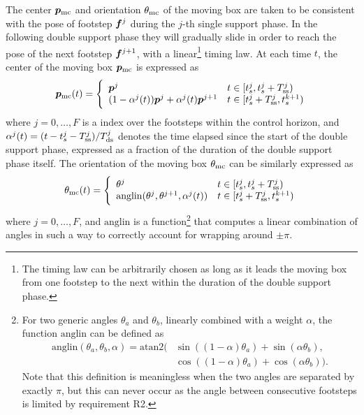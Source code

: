 The center ${\bm{p}}_{\rm mc}$ and orientation $\theta_{\rm mc}$ of the moving box are taken to be consistent with the pose of footstep ${\bm{f}}^j$ during the $j$-th single support phase. In the following double support phase they will gradually slide in order to reach the pose of the next footstep ${\bm{f}}^{j+1}$, with a linear\footnote{The timing law can be arbitrarily chosen as long as it leads the moving box from one footstep to the next within the duration of the double support phase.} timing law. At each time $t$, the center of the moving box ${\bm{p}}_{\rm mc}$ is expressed as
\begin{equation}\label{eq:WoS: moving constraint}
{\bm{p}}_{\rm mc}(t) = \Bigg\{
\begin{array}{ll}
{\bm{p}}^j & t\in [t_s^j, t_s^j + T_{\rm ss}^j) \\
(1-\alpha^j(t)){\bm{p}}^j + \alpha^j(t){\bm{p}}^{j+1} & t\in [t_s^j + T_{\rm ss}^j, t_s^{k+1})
\end{array}
\end{equation}
where $j=0,\dots,F$ is a index over the footsteps within the control horizon, and $\alpha^j(t) = (t-t_s^j-T_{\rm ss}^j)/T_{\rm ds}^j$ denotes the time elapsed since the start of the double support phase, expressed as a fraction of the duration of the double support phase itself.
The orientation of the moving box $\theta_{\rm mc}$ can be similarly expressed as
\begin{equation}\label{eq:WoS: moving constraint angle}
\theta_{\rm mc}(t) = \Bigg\{
\begin{array}{ll}
\theta^j & t\in [t_s^j, t_s^j + T_{\rm ss}^j) \\
\mathrm{anglin}(\theta^j,\theta^{j+1},\alpha^j(t)) & t\in [t_s^j + T_{\rm ss}^j, t_s^{k+1})
\end{array}
\end{equation}
where $j=0,\dots,F$, and $\mathrm{anglin}$ is a function\footnote{For two generic angles
$\theta_a$ and $\theta_b$, linearly combined with a weight $\alpha$, the function $\mathrm{anglin}$ can be defined as
\begin{equation*}\begin{split}
\mathrm{anglin}(\theta_a, \theta_b, \alpha) = \mathrm{atan2}(&\sin((1-\alpha)\theta_a) + \sin(\alpha\theta_b), \\&\cos((1-\alpha)\theta_a) + \cos(\alpha\theta_b)).
\end{split}\end{equation*}
Note that this definition is meaningless when the two angles are separated by exactly $\pi$, but this can never occur as the angle between consecutive footsteps is limited by requirement R2. } that computes a linear combination of angles in such a way to correctly account for wrapping around $\pm\pi$.


